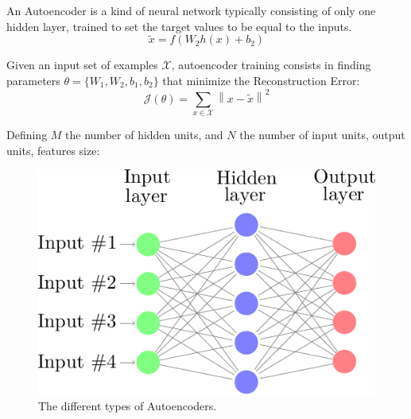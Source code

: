 %



An Autoencoder is a kind of neural network typically consisting of only one hidden layer, trained to set the target values to be equal to the inputs.
\begin{equation} %
\tilde{x} = f(W_{2}h(x) +b_{2})
\end{equation}



Given an input set of examples $\mathcal{X}$, autoencoder training consists
in finding parameters $\theta=\{W_{1},W_{2},b_{1},b_{2}\}$ that
minimize the Reconstruction Error:
\begin{equation}\label{eq:obAE}
\mathcal{J}(\theta)=\sum_{x\in{\mathcal{X}}}\left\| x - \tilde{x}\right\|^{2}
\end{equation}

Defining $M$ the number of hidden units, and $N$ the number of input units, output units, features size:

\begin{figure}
	\centering
	\includegraphics[width=\columnwidth]{img/autoencoder}
	\caption{The different types of Autoencoders.}
	\label{fig:backg:dnn:AE}
\end{figure}

